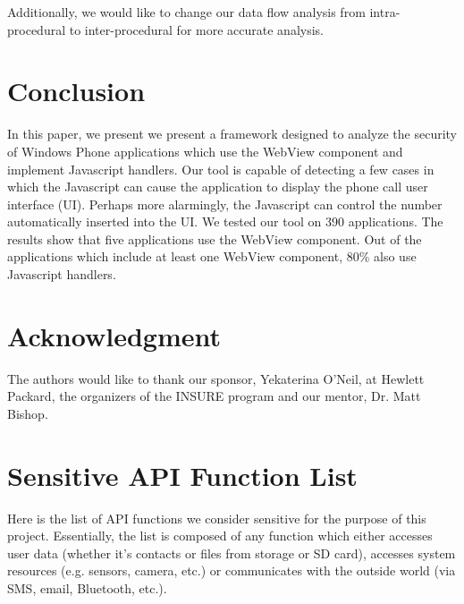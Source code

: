\documentclass[conference]{IEEEtran}
\begin{document}
Additionally, we would like to change our data flow analysis from intra-procedural to inter-procedural for more accurate analysis.

\section{Conclusion}
In this paper, we present we present a framework designed to analyze the security of Windows Phone applications which use the WebView component and implement Javascript handlers. Our tool is capable of detecting a few cases in which the Javascript can cause the application to display the phone call user interface (UI). Perhaps more alarmingly, the Javascript can control the number automatically inserted into the UI. We tested our tool on 390 applications. The results show that five applications use the WebView component. Out of the applications which include at least one WebView component, 80\% also use Javascript handlers.

\section*{Acknowledgment}
The authors would like to thank our sponsor, Yekaterina O'Neil, at Hewlett Packard, the organizers of the INSURE program and our mentor, Dr. Matt Bishop.




\appendix
\section{Sensitive API Function List}
Here is the list of API functions we consider sensitive for the purpose of this project.
Essentially, the list is composed of any function which either accesses user data (whether it's contacts or files from storage or SD card), accesses system resources (e.g. sensors, camera, etc.) or communicates with the outside world (via SMS, email, Bluetooth, etc.).

\end{document}
